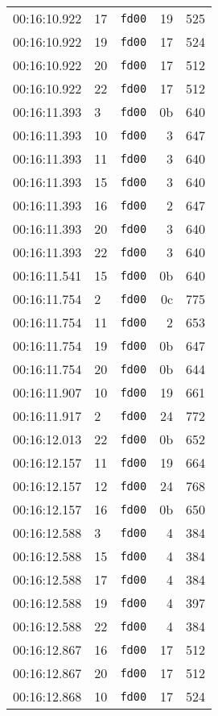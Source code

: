 \documentclass{article}
\begin{document}
\begin{longtable}{lllrr}
00:16:10.922 & 17 & \texttt{fd00} & 19 & 525 \\
00:16:10.922 & 19 & \texttt{fd00} & 17 & 524 \\
00:16:10.922 & 20 & \texttt{fd00} & 17 & 512 \\
00:16:10.922 & 22 & \texttt{fd00} & 17 & 512 \\
00:16:11.393 & 3 & \texttt{fd00} & 0b & 640 \\
00:16:11.393 & 10 & \texttt{fd00} & 3 & 647 \\
00:16:11.393 & 11 & \texttt{fd00} & 3 & 640 \\
00:16:11.393 & 15 & \texttt{fd00} & 3 & 640 \\
00:16:11.393 & 16 & \texttt{fd00} & 2 & 647 \\
00:16:11.393 & 20 & \texttt{fd00} & 3 & 640 \\
00:16:11.393 & 22 & \texttt{fd00} & 3 & 640 \\
00:16:11.541 & 15 & \texttt{fd00} & 0b & 640 \\
00:16:11.754 & 2 & \texttt{fd00} & 0c & 775 \\
00:16:11.754 & 11 & \texttt{fd00} & 2 & 653 \\
00:16:11.754 & 19 & \texttt{fd00} & 0b & 647 \\
00:16:11.754 & 20 & \texttt{fd00} & 0b & 644 \\
00:16:11.907 & 10 & \texttt{fd00} & 19 & 661 \\
00:16:11.917 & 2 & \texttt{fd00} & 24 & 772 \\
00:16:12.013 & 22 & \texttt{fd00} & 0b & 652 \\
00:16:12.157 & 11 & \texttt{fd00} & 19 & 664 \\
00:16:12.157 & 12 & \texttt{fd00} & 24 & 768 \\
00:16:12.157 & 16 & \texttt{fd00} & 0b & 650 \\
00:16:12.588 & 3 & \texttt{fd00} & 4 & 384 \\
00:16:12.588 & 15 & \texttt{fd00} & 4 & 384 \\
00:16:12.588 & 17 & \texttt{fd00} & 4 & 384 \\
00:16:12.588 & 19 & \texttt{fd00} & 4 & 397 \\
00:16:12.588 & 22 & \texttt{fd00} & 4 & 384 \\
00:16:12.867 & 16 & \texttt{fd00} & 17 & 512 \\
00:16:12.867 & 20 & \texttt{fd00} & 17 & 512 \\
00:16:12.868 & 10 & \texttt{fd00} & 17 & 524 \\

\end{longtable}
\end{document}
